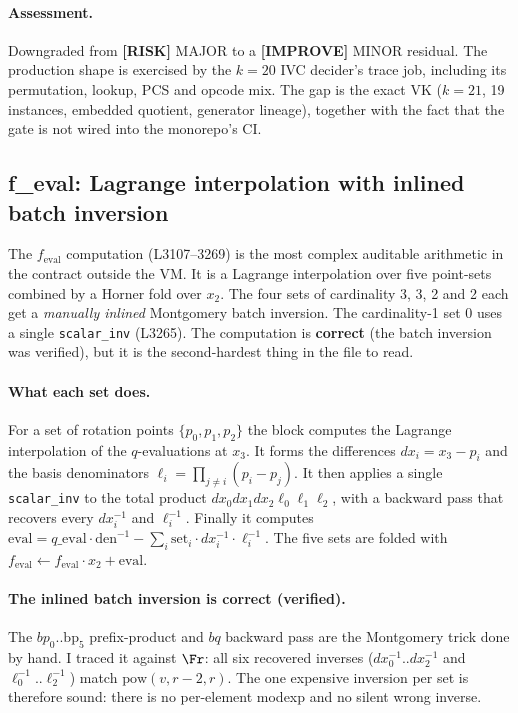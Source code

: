 \paragraph{Assessment.}  Downgraded from
\textcolor{rustorange}{\textbf{[RISK]}} MAJOR to a
\textcolor{codegenblue}{\textbf{[IMPROVE]}} MINOR residual. The
production shape is exercised by the $k=20$ IVC decider's trace
job, including its permutation, lookup, PCS and opcode mix. The
gap is the exact VK ($k=21$, 19 instances, embedded quotient,
generator lineage), together with the fact that the gate is not
wired into the monorepo's CI.

\subsection{f\_eval: Lagrange interpolation with inlined batch inversion}
\label{sec:pr-feval}

The $f_\text{eval}$ computation (L3107--3269) is the most complex
auditable arithmetic in the contract outside the VM. It is a Lagrange
interpolation over five point-sets combined by a Horner fold over
$x_2$. The four sets of cardinality 3, 3, 2 and 2 each get a
\emph{manually inlined} Montgomery batch inversion. The
cardinality-1 set 0 uses a single \texttt{scalar\_inv}
(L3265). The computation is \textbf{correct} (the batch inversion
was verified), but it is the second-hardest thing in the file to read.

\paragraph{What each set does.}
For a set of rotation points $\{p_0,p_1,p_2\}$ the block
computes the Lagrange interpolation of the $q$-evaluations at
$x_3$. It forms the differences $dx_i = x_3 - p_i$ and the basis
denominators $\ell_i = \prod_{j\ne i}(p_i - p_j)$. It then
applies a single \texttt{scalar\_inv} to the total product
$dx_0 dx_1 dx_2 \ell_0 \ell_1 \ell_2$, with a backward pass that
recovers every $dx_i^{-1}$ and $\ell_i^{-1}$. Finally it computes
$\text{eval} = q\_\text{eval}\cdot\text{den}^{-1} -
\sum_i \text{set}_i \cdot dx_i^{-1}\cdot \ell_i^{-1}$. The five
sets are folded with $f_\text{eval} \leftarrow
f_\text{eval}\cdot x_2 + \text{eval}$.

\paragraph{The inlined batch inversion is correct (verified).}
The $bp_0..\text{bp}_5$ prefix-product and $bq$ backward pass are
the Montgomery trick done by hand. I traced it against $\Fr$: all
six recovered inverses ($dx_0^{-1}..dx_2^{-1}$ and
$\ell_0^{-1}..\ell_2^{-1}$) match $\text{pow}(v, r-2, r)$. The one
expensive inversion per set is therefore sound: there is no
per-element modexp and no silent wrong inverse.

